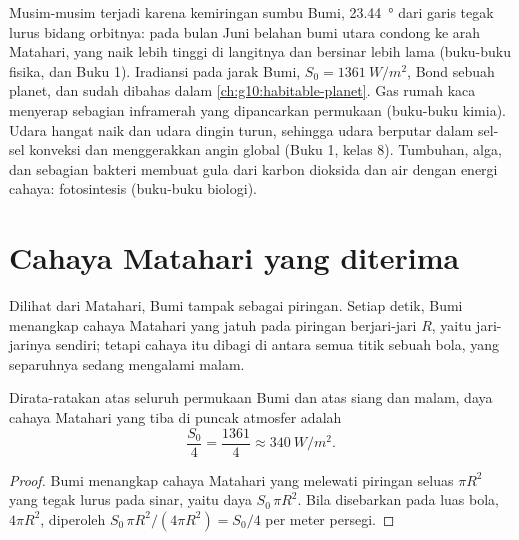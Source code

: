\begin{recall}
Musim-musim terjadi karena kemiringan sumbu Bumi, \qty{23.44}{\degree} dari
garis tegak lurus bidang orbitnya: pada bulan Juni belahan bumi utara condong
ke arah Matahari, yang naik lebih tinggi di langitnya dan bersinar lebih lama
(buku-buku fisika, dan Buku 1). Iradiansi pada jarak Bumi,
$S_0 = \qty{1361}{W/m^2}$,  Bond sebuah planet, dan  sudah dibahas dalam \cref{ch:g10:habitable-planet}. Gas rumah
kaca menyerap sebagian inframerah yang dipancarkan permukaan (buku-buku kimia).
Udara hangat naik dan udara dingin turun, sehingga udara berputar dalam
sel-sel konveksi dan menggerakkan angin global (Buku 1, kelas 8). Tumbuhan,
alga, dan sebagian bakteri membuat gula dari karbon dioksida dan air dengan
energi cahaya: fotosintesis (buku-buku biologi).
\end{recall}

\section{Cahaya Matahari yang diterima}

Dilihat dari Matahari, Bumi tampak sebagai piringan. Setiap detik, Bumi
menangkap cahaya Matahari yang jatuh pada piringan berjari-jari $R$, yaitu
jari-jarinya sendiri; tetapi cahaya itu dibagi di antara semua titik sebuah
bola, yang separuhnya sedang mengalami malam.

\begin{proposition}\label{prop:g10:earth-energy-budget:quarter}
Dirata-ratakan atas seluruh permukaan Bumi dan atas siang dan malam, daya
cahaya Matahari yang tiba di puncak atmosfer adalah
\[
  \frac{S_0}{4} = \frac{1361}{4} \approx \qty{340}{W/m^2}.
\]
\end{proposition}

\begin{proof}
Bumi menangkap cahaya Matahari yang melewati piringan seluas $\pi R^2$ yang
tegak lurus pada sinar, yaitu daya $S_0\,\pi R^2$. Bila disebarkan pada luas
bola, $4\pi R^2$, diperoleh $S_0\,\pi R^2/(4\pi R^2) =
S_0/4$ per meter persegi.
\end{proof}

